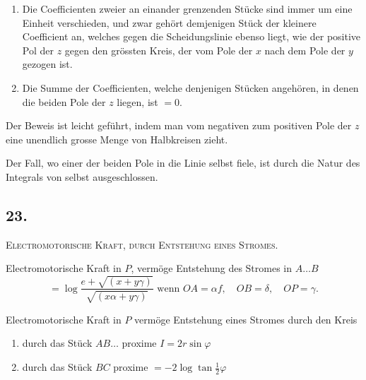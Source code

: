 \documentclass[fontsize=10pt,paper=a5,pagesize=auto]{scrbook}
\newcommand{\origpage}[1]{\marginpar{\footnotesize\textit{S. #1}}}
\begin{document}
\begin{enumerate}[label=\arabic*.]
\item Die Coefficienten zweier an einander grenzenden Stücke sind immer um eine Einheit verschieden, und zwar gehört demjenigen Stück der kleinere Coefficient an, welches gegen die Scheidungslinie ebenso liegt, wie der positive Pol der $z$ gegen den grössten Kreis, der vom Pole der $x$ nach dem Pole der $y$ gezogen ist.

\item Die Summe der Coefficienten, welche denjenigen Stücken angehören, in denen die beiden Pole der $z$ liegen, ist $= 0$.
\end{enumerate}

Der Beweis ist leicht geführt, indem man vom negativen zum positiven Pole der $z$ eine unendlich grosse Menge von Halbkreisen zieht.

Der Fall, wo einer der beiden Pole in die Linie selbst fiele, ist durch die Natur des Integrals von selbst ausgeschlossen.

\subsection*{23.}
\origpage{624}
\textsc{Electromotorische Kraft, durch Entstehung eines Stromes.}

\begin{center}
\end{center}

Electromotorische Kraft in $P$, vermöge Entstehung des Stromes in $A\dots B$
\[
= \log \frac{e + \sqrt{(x + y\gamma)}}{\sqrt{(x\alpha + y\gamma)}} \text{ wenn } OA = \alpha f, \quad OB = \delta, \quad OP = \gamma.
\]

Electromotorische Kraft in $P$ vermöge Entstehung eines Stromes durch den Kreis
\begin{enumerate}[label=\arabic*.]
\item durch das Stück $AB\dots$ proxime $I = 2r\sin\varphi$
\item durch das Stück $BC$ proxime $= -2\log \tan \tfrac{1}{2}\varphi$
\end{enumerate}
\end{document}
